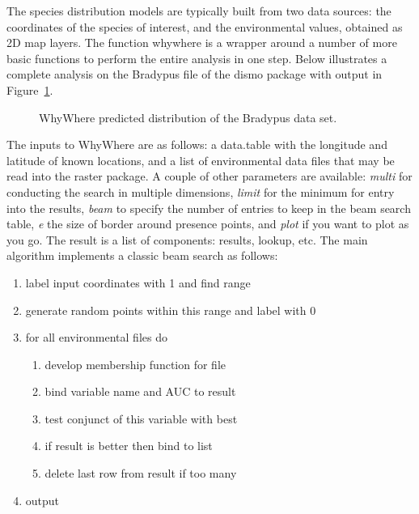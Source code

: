 \documentclass{article}
\newcommand{\pkg}[1]{{\fontseries{b}\selectfont #1}}
\begin{document}
The species distribution models are typically built from two data sources: the coordinates of the species of interest, and the environmental values, obtained as 2D map layers.  The function whywhere is a wrapper around a number of more basic functions to perform the entire analysis in one step.  Below illustrates a complete analysis on the Bradypus file of the \pkg{dismo} package \cite{dismo} with output in Figure~\ref{fig1}.  


\begin{figure}[htbp]
\begin{center}
\begin{Schunk}
\end{Schunk}
\caption{\label{fig1} \pkg{WhyWhere} predicted distribution of the Bradypus data set.}
\end{center}
\end{figure}

The inputs to \pkg{WhyWhere} are as follows: a \pkg{data.table} with the longitude and latitude of known locations, and a list of environmental data files that may be read into the raster package.  A couple of other parameters are available:   \emph{multi} for conducting the search in multiple dimensions, \emph{limit} for the minimum for entry into the results, \emph{beam} to specify the number of entries to keep in the beam search table, \emph{e} the size of border around presence points, and \emph{plot} if you want to plot as you go.  The result is  a list of components:  results, lookup, etc.  The main algorithm implements a classic beam search as follows:

\begin{enumerate}
\item label input coordinates with 1 and find range
\item generate random points within this range and label with 0
\item for all environmental files do
\begin{enumerate}
\item develop membership function for file
\item bind variable name and AUC to result 
\item test conjunct of this variable with best
\item if result is better then bind to list
\item delete last row from result if too many
\end{enumerate}
\item output
\end{enumerate}
\end{document}
